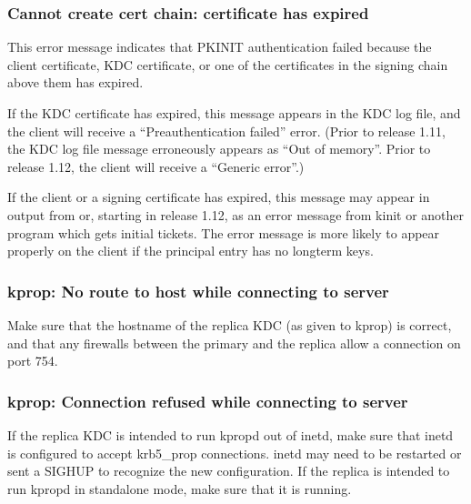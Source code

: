 \documentclass[letterpaper,10pt,english]{sphinxmanual}
\begin{document}
\subsubsection{Cannot create cert chain: certificate has expired}
\label{\detokenize{admin/troubleshoot:cannot-create-cert-chain-certificate-has-expired}}\label{\detokenize{admin/troubleshoot:err-cert-chain-cert-expired}}
\sphinxAtStartPar
This error message indicates that PKINIT authentication failed because
the client certificate, KDC certificate, or one of the certificates in
the signing chain above them has expired.

\sphinxAtStartPar
If the KDC certificate has expired, this message appears in the KDC
log file, and the client will receive a “Preauthentication failed”
error.  (Prior to release 1.11, the KDC log file message erroneously
appears as “Out of memory”.  Prior to release 1.12, the client will
receive a “Generic error”.)

\sphinxAtStartPar
If the client or a signing certificate has expired, this message may
appear in {\hyperref[\detokenize{admin/troubleshoot:trace-logging}]{}} output from  or, starting in
release 1.12, as an error message from kinit or another program which
gets initial tickets.  The error message is more likely to appear
properly on the client if the principal entry has no long\sphinxhyphen{}term keys.


\subsubsection{kprop: No route to host while connecting to server}
\label{\detokenize{admin/troubleshoot:kprop-no-route-to-host-while-connecting-to-server}}\label{\detokenize{admin/troubleshoot:kprop-no-route}}
\sphinxAtStartPar
Make sure that the hostname of the replica KDC (as given to kprop) is
correct, and that any firewalls between the primary and the replica
allow a connection on port 754.


\subsubsection{kprop: Connection refused while connecting to server}
\label{\detokenize{admin/troubleshoot:kprop-connection-refused-while-connecting-to-server}}\label{\detokenize{admin/troubleshoot:kprop-con-refused}}
\sphinxAtStartPar
If the replica KDC is intended to run kpropd out of inetd, make sure
that inetd is configured to accept krb5\_prop connections.  inetd may
need to be restarted or sent a SIGHUP to recognize the new
configuration.  If the replica is intended to run kpropd in standalone
mode, make sure that it is running.
\end{document}
